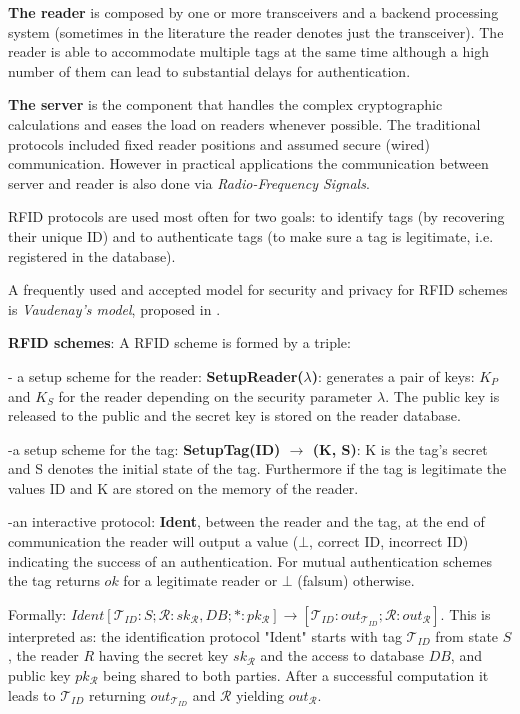         \textbf{The reader} is composed by one or more transceivers and a backend processing system (sometimes in the literature the reader denotes just the transceiver). 
    The reader is able to accommodate multiple tags at the same time although a high number of them can lead to substantial delays for authentication. 
    
        \textbf{The server} is the component that handles the complex cryptographic calculations and eases the load on readers whenever possible. The traditional protocols
    included fixed reader positions and assumed secure (wired) communication. However in practical applications the communication between server and reader is also done via 
    \textit{Radio-Frequency Signals}.

        RFID protocols are used most often for two goals: to identify tags (by recovering their unique ID) and to authenticate tags (to make sure a tag is legitimate, i.e. registered in 
    the database). 

        A frequently used and accepted model for security and privacy for RFID schemes is \textit{Vaudenay's model}, proposed in \cite{Vaudenay}. 

    \textbf{RFID schemes}: A RFID scheme is formed by a triple:

    - a setup scheme for the reader: \textbf{SetupReader($\lambda$)}: generates a pair of keys: $K_P$ and 
    $K_S$ for the reader depending on the security parameter $\lambda$. The public key is released
    to the public and the secret key is stored on the reader database.

    -a setup scheme for the tag: \textbf{SetupTag(ID) $\rightarrow$ (K, S)}: K is the tag's secret and S denotes the 
    initial state of the tag. Furthermore if the tag is legitimate the values ID and K are stored
    on the memory of the reader.
    
    -an interactive protocol: \textbf{Ident}, between the reader and the tag, at the end of communication the reader
    will output a value ($\bot$, correct ID, incorrect ID) indicating the success of an authentication. For mutual authentication
    schemes the tag returns $ok$ for a legitimate reader or $\bot$ (falsum) otherwise. 
    
    Formally: $Ident[\mathcal{T}_{ID}:S; \mathcal{R}: sk_{\mathcal{R}}, DB; *:pk_{\mathcal{R}}] \rightarrow 
    [\mathcal{T}_{ID}:out_{\mathcal{T}_{ID}}; \mathcal{R}:out_{\mathcal{R}}]$. This is interpreted as:
    the identification protocol "Ident" starts with tag $\mathcal{T}_{ID}$ from state $S$, the reader $R$ having the secret key 
    $sk_{\mathcal{R}}$ and the access to database $DB$, and public key $pk_{\mathcal{R}}$ being shared to both parties. After a 
    successful computation it leads to $\mathcal{T}_{ID}$ returning $out_{\mathcal{T}_{ID}}$ and $\mathcal{R}$ yielding $out_{\mathcal{R}}$.

